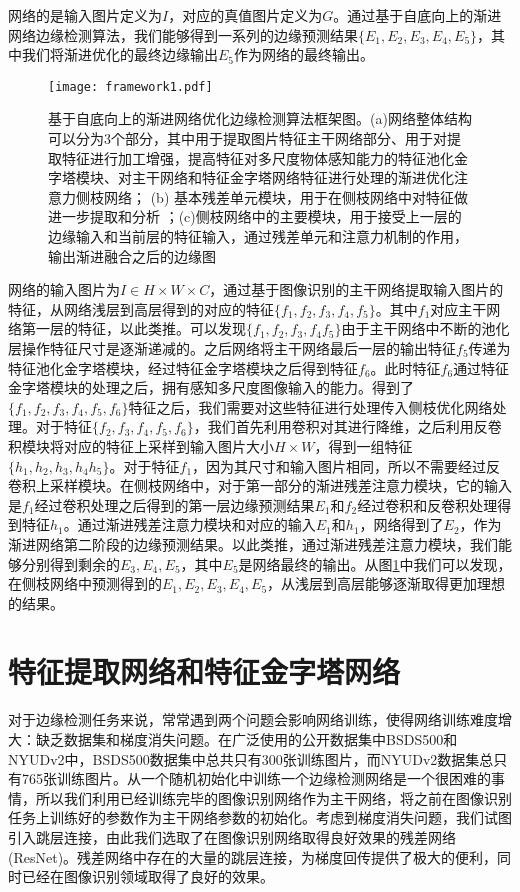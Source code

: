 \documentclass[master]{thesis-uestc}
\begin{document}
网络的是输入图片定义为$I$，对应的真值图片定义为$G$。通过基于自底向上的渐进网络边缘检测算法，我们能够得到一系列的边缘预测结果$\{E_1, E_2, E_3, E_4, E_5\}$，其中我们将渐进优化的最终边缘输出$E_5$作为网络的最终输出。
\begin{figure}[h!]
    \texttt{[image: framework1.pdf]}
    \caption{基于自底向上的渐进网络优化边缘检测算法框架图。(a)网络整体结构可以分为3个部分，其中用于提取图片特征主干网络部分、用于对提取特征进行加工增强，提高特征对多尺度物体感知能力的特征池化金字塔模块、对主干网络和特征金字塔网络特征进行处理的渐进优化注意力侧枝网络； (b) 基本残差单元模块，用于在侧枝网络中对特征做进一步提取和分析 ；(c)侧枝网络中的主要模块，用于接受上一层的边缘输入和当前层的特征输入，通过残差单元和注意力机制的作用，输出渐进融合之后的边缘图}
    \label{framework1}
\end{figure}
网络的输入图片为$I \in H \times W \times C$，通过基于图像识别的主干网络提取输入图片的特征，从网络浅层到高层得到的对应的特征$\{f_1, f_2, f_3, f_4,f_5\}$。其中$f_1$对应主干网络第一层的特征，以此类推。可以发现$\{f_1, f_2, f_3, f_4 f_5\}$由于主干网络中不断的池化层操作特征尺寸是逐渐递减的。之后网络将主干网络最后一层的输出特征$f_5$传递为特征池化金字塔模块，经过特征金字塔模块之后得到特征$f_6$。此时特征$f_6$通过特征金字塔模块的处理之后，拥有感知多尺度图像输入的能力。得到了$\{f_1, f_2, f_3, f_4,  f_5, f_6\}$特征之后，我们需要对这些特征进行处理传入侧枝优化网络处理。对于特征$\{f_2, f_3, f_4,  f_5, f_6\}$，我们首先利用卷积对其进行降维，之后利用反卷积模块将对应的特征上采样到输入图片大小$H \times W$，得到一组特征$\{h_1, h_2, h_3, h_4 h_5\}$。对于特征$f_1$，因为其尺寸和输入图片相同，所以不需要经过反卷积上采样模块。在侧枝网络中，对于第一部分的渐进残差注意力模块，它的输入是$f_1$经过卷积处理之后得到的第一层边缘预测结果$E_1$和$f_2$经过卷积和反卷积处理得到特征$h_1$。通过渐进残差注意力模块和对应的输入$E_1$和$h_1$，网络得到了$E_2$，作为渐进网络第二阶段的边缘预测结果。以此类推，通过渐进残差注意力模块，我们能够分别得到剩余的$E_3, E_4, E_5$，其中$E_5$是网络最终的输出。从图\ref{framework1}中我们可以发现，在侧枝网络中预测得到的$E_1, E_2, E_3, E_4, E_5$，从浅层到高层能够逐渐取得更加理想的结果。

\section{特征提取网络和特征金字塔网络}

对于边缘检测任务来说，常常遇到两个问题会影响网络训练，使得网络训练难度增大：缺乏数据集和梯度消失问题。在广泛使用的公开数据集中BSDS500和NYUDv2中，BSDS500数据集中总共只有300张训练图片，而NYUDv2数据集总只有765张训练图片。从一个随机初始化中训练一个边缘检测网络是一个很困难的事情，所以我们利用已经训练完毕的图像识别网络作为主干网络，将之前在图像识别任务上训练好的参数作为主干网络参数的初始化。考虑到梯度消失问题，我们试图引入跳层连接，由此我们选取了在图像识别网络取得良好效果的残差网络(ResNet)。残差网络中存在的大量的跳层连接，为梯度回传提供了极大的便利，同时已经在图像识别领域取得了良好的效果。
\end{document}
